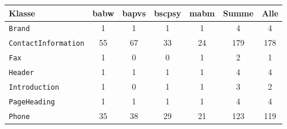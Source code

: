         \begin{table}[!h]
            \centering
            \begin{tabular}{|l|c|c|c|c|c|c|}
            \hline
                \textbf{Klasse}  & \multicolumn{1}{l|}{\textbf{\gls{babw}}} & \multicolumn{1}{l|}{\textbf{\gls{bapvs}}} & \multicolumn{1}{l|}{\textbf{\gls{bscpsy}}} & \multicolumn{1}{l|}{\textbf{\gls{mabm}}} & \multicolumn{1}{l|}{\textbf{Summe}} & \multicolumn{1}{l|}{\textbf{Alle}} \\ \hline
                \texttt{Brand}              & 1                                  & 1                                   & 1                                    & 1                                  & 4                                   & 4                                  \\ \hline
                \texttt{ContactInformation} & 55                                 & 67                                  & 33                                   & 24                                 & 179                                 & 178                                \\ \hline
                \texttt{Fax}                & 1                                  & 0                                   & 0                                    & 1                                  & 2                                   & 1                                  \\ \hline
                \texttt{Header}             & 1                                  & 1                                   & 1                                    & 1                                  & 4                                   & 4                                  \\ \hline
                \texttt{Introduction}       & 1                                  & 0                                   & 1                                    & 1                                  & 3                                   & 2                                  \\ \hline
                \texttt{PageHeading}        & 1                                  & 1                                   & 1                                    & 1                                  & 4                                   & 4                                  \\ \hline
                \texttt{Phone}              & 35                                 & 38                                  & 29                                   & 21                                 & 123                                 & 119                                \\ \hline

\end{tabular}
\end{table}
